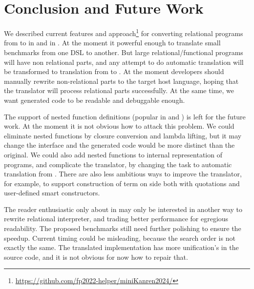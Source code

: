 
\section{Conclusion and Future Work}

We described current features and approach\footnote{\url{https://github.com/fp2022-helper/miniKanren2024/}} for converting relational programs from \OCanren{} to \Klogic{} in \Kotlin{} and \miniKanren{} in \Scheme{}.
At the moment it powerful enough to translate small benchmarks from one DSL to another.
But large relational/functional programs will have  non relational parts, and any attempt to do automatic translation will be transformed to translation from \OCaml{} to \Scheme{}.
At the moment developers should manually rewrite non-relational parts to the target host language, hoping that the translator will process relational parts successfully.
At the same time, we want generated code to be readable and debuggable enough.

The support of nested function definitions (popular in \OCaml{} and \OCanren{}) is left for the future work.
At the moment it is not obvious how to attack this problem.
We could eliminate nested functions by closure conversion and lambda lifting, but it may change the interface and the generated code would be more distinct than the original.
We could also add nested functions to internal representation of \OCanren{} programs, and complicate the translator, by changing the task to automatic translation from \OCaml{}. There are also less ambitious ways to improve the translator, for example, to support construction of term on \Scheme{} side both with quotations and user-defined smart constructors.

The reader enthusiastic only about \miniKanren{} in \Scheme{} may only be interested in another way to rewrite relational interpreter, and trading better performance for egregious readability.
The proposed benchmarks still need further polishing to ensure the speedup.
Current timing could be misleading, because the search order is not exactly the same.
The translated implementation has more unification's in the source code, and it is not obvious for now how to repair that.
